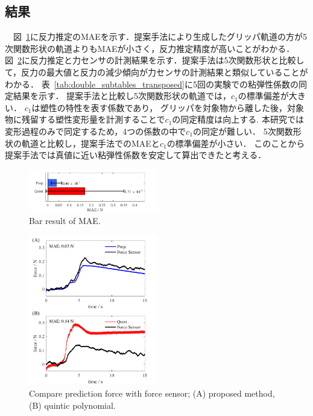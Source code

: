 \documentclass[a4paper]{jarticle}
\begin{document}
\subsection{結果}
　図~\ref{fig:bar_result}に反力推定のMAEを示す．提案手法により生成したグリッパ軌道の方が5次関数形状の軌道よりもMAEが小さく，反力推定精度が高いことがわかる．
図~\ref{fig:prop_quint}に反力推定と力センサの計測結果を示す．提案手法は5次関数形状と比較して，反力の最大値と反力の減少傾向が力センサの計測結果と類似していることがわかる．
{\color{blue}表~\ref{tab:double_subtables_transposed}に5回の実験での粘弾性係数の同定結果を示す．
提案手法と比較し5次関数形状の軌道では，$c_1$の標準偏差が大きい．
$c_1$は塑性の特性を表す係数であり，
グリッパを対象物から離した後，対象物に残留する塑性変形量を計測することで$c_1$の同定精度は向上する\cite{reult_higasimori}.
本研究では変形過程のみで同定するため，4つの係数の中で$c_1$の同定が難しい．
5次関数形状の軌道と比較し，提案手法でのMAEと$c_1$の標準偏差が小さい．
このことから提案手法では真値に近い粘弾性係数を安定して算出できたと考える．
}
\begin{figure}[tb]
    \centering
    \includegraphics[width=0.5\textwidth]{bar_result_chiken.pdf}
    \caption{Bar result of MAE.}  
    \label{fig:bar_result}
\end{figure}
\begin{figure}[tb]
    \centering
    \includegraphics[width=0.5\textwidth]{prop_quint.pdf}
    \captionsetup{width=0.9\linewidth} %
    \caption{Compare prediction force with force sensor; (A) proposed method, (B) quintic polynomial.}
    \label{fig:prop_quint}
\end{figure}
\end{document}
